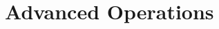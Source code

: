\documentclass[main.tex]{subfiles}
\begin{document}
\section{Advanced Operations}
\label{sec:advanced_operations}
\end{document}
